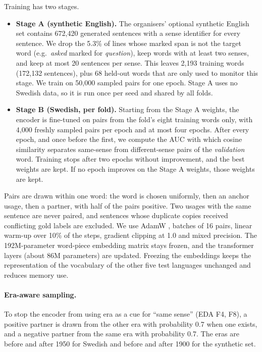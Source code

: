 Training has two stages.
\begin{itemize}
  \item \textbf{Stage A (synthetic English).} The organisers' optional synthetic
        English set \citep{tahmasebi2026semeval} contains 672{,}420 generated
        sentences with a sense identifier for every sentence. We drop the 5.3\%
        of lines whose marked span is not the target word (e.g.\ \textit{asked}
        marked for \textit{question}), keep words with at least two senses, and
        keep at most 20 sentences per sense. This leaves 2{,}193 training words
        (172{,}132 sentences), plus 68 held-out words that are only used to
        monitor this stage. We train on 50{,}000 sampled pairs for one epoch.
        Stage A uses no Swedish data, so it is run once per seed and shared by
        all folds.
  \item \textbf{Stage B (Swedish, per fold).} Starting from the Stage A weights,
        the encoder is fine-tuned on pairs from the fold's eight training words
        only, with 4{,}000 freshly sampled pairs per epoch and at most four
        epochs. After every epoch, and once before the first, we compute the AUC
        with which cosine similarity separates same-sense from different-sense
        pairs of the \emph{validation} word. Training stops after two epochs
        without improvement, and the best weights are kept. If no epoch improves
        on the Stage A weights, those weights are kept.
\end{itemize}
Pairs are drawn within one word: the word is chosen uniformly, then an anchor
usage, then a partner, with half of the pairs positive. Two usages with the same
sentence are never paired, and sentences whose duplicate copies received
conflicting gold labels are excluded. We use AdamW
\citep{loshchilov2019adamw}, batches of 16 pairs, linear warm-up over 10\% of the
steps, gradient clipping at 1.0 and mixed precision. The 192M-parameter word-piece
embedding matrix stays frozen, and the transformer layers (about 86M parameters)
are updated. Freezing the embeddings keeps the representation of the vocabulary
of the other five test languages unchanged and reduces memory use.

\paragraph{Era-aware sampling.} To stop the encoder from using era as a cue for
``same sense'' (EDA F4, F8), a positive partner is drawn from the other era with
probability 0.7 when one exists, and a negative partner from the same era with
probability 0.7. The eras are before and after 1950 for Swedish and before and
after 1900 for the synthetic set.

